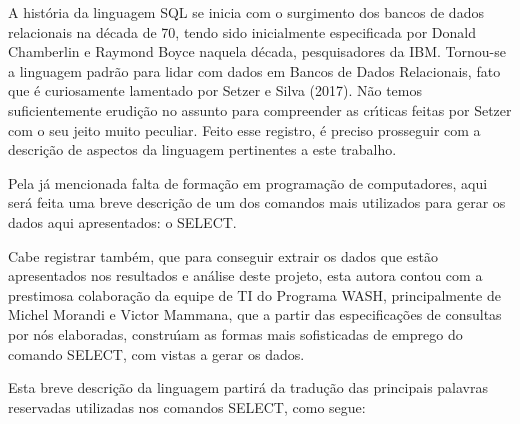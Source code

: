 \documentclass[
12pt,		%
openright,	%
twoside,  %
a4paper,			%
chapter=TITLE,		%
english,			%
french,				%
spanish,			%
brazil				%
]{USPSC-classe/USPSC}
\begin{document}
A hist\'oria da linguagem SQL se inicia com o surgimento dos bancos de dados relacionais na d\'ecada de 70, tendo sido inicialmente especificada por Donald Chamberlin e Raymond Boyce naquela d\'ecada, pesquisadores da IBM. Tornou-se a linguagem padr\~ao para lidar com dados em Bancos de Dados Relacionais, fato que \'e curiosamente lamentado por  Setzer e Silva (2017). N\~ao temos suficientemente erudi\c{c}\~ao no assunto para compreender as cr\'{\i}ticas feitas por Setzer com o seu jeito muito peculiar. Feito esse registro, \'e preciso prosseguir com a descri\c{c}\~ao de aspectos da linguagem pertinentes a este trabalho.

















Pela j\'a mencionada falta de forma\c{c}\~ao em programa\c{c}\~ao de computadores, aqui ser\'a feita uma breve descri\c{c}\~ao de um dos comandos mais utilizados para gerar os dados aqui apresentados: o SELECT.

















Cabe registrar tamb\'em, que para conseguir extrair os dados que est\~ao apresentados nos resultados e an\'alise deste projeto, esta autora contou com a prestimosa colabora\c{c}\~ao da equipe de TI do Programa WASH, principalmente de Michel Morandi e Victor Mammana, que a partir das especifica\c{c}\~oes de consultas por n\'os elaboradas, constru\'{\i}am as formas mais sofisticadas de emprego do comando SELECT, com vistas a gerar os dados.

















Esta breve descri\c{c}\~ao da linguagem partir\'a da tradu\c{c}\~ao das principais palavras reservadas utilizadas nos comandos SELECT, como segue:
\end{document}
